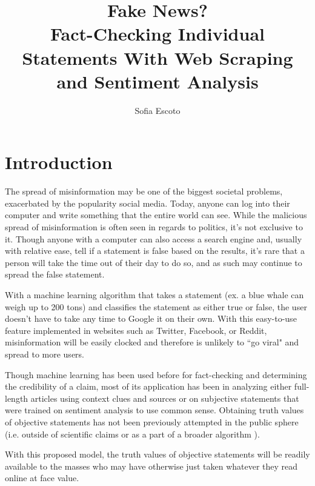 \documentclass[]{article}
\title{Fake News? 
	\\\smaller[2]{}Fact-Checking Individual Statements With Web Scraping and Sentiment Analysis}
\author{Sofia Escoto}
\begin{document}
	\maketitle
	
	\section{Introduction}
		
		
		The spread of misinformation may be one of the biggest societal problems, exacerbated by the popularity social media. Today, anyone can log into their computer and write something that the entire world can see. While the malicious spread of misinformation is  often seen in regards to politics, it's not exclusive to it. Though anyone with a computer can also access a search engine and, usually with relative ease, tell if a statement is false based on the results, it's rare that a person will take the time out of their day to do so, and as such may continue to spread the false statement.
		
		With a machine learning algorithm that takes a statement (ex. a blue whale can weigh up to 200 tons) and classifies the statement as either true or false, the user doesn't have to take any time to Google it on their own. With this easy-to-use feature implemented in websites such as Twitter, Facebook, or Reddit, misinformation will be easily clocked and therefore is unlikely to ``go viral" and spread to more users. 
		
		Though machine learning has been used before for fact-checking and determining the credibility of a claim, most of its application has been in analyzing either full-length articles using context clues and sources or on subjective statements that were trained on sentiment analysis to use common sense. Obtaining truth values of objective statements has not been previously attempted in the public sphere (i.e. outside of scientific claims \cite{wadden20} or as a part of a broader algorithm \cite{lazarski21}).
		
		 With this proposed model, the truth values of objective statements will be readily available to the masses who may have otherwise just taken whatever they read online at face value.
		
\end{document}
